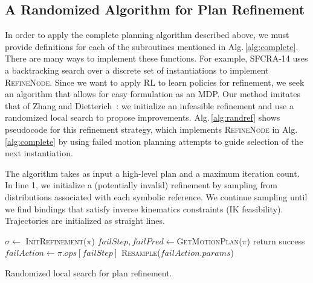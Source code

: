 \subsection{A Randomized Algorithm for Plan Refinement}
In order to apply the complete planning algorithm described above, we must provide definitions for each of the subroutines mentioned in Alg.\,\ref{alg:complete}. There are many ways to implement these functions. For example, SFCRA-14 uses a backtracking search over a discrete set of instantiations to implement \textsc{RefineNode}. Since we want to apply RL to learn policies for refinement,
we seek an algorithm that allows for easy formulation as an MDP. Our method
imitates that of Zhang and Dietterich~\cite{JobShopSched}:
we initialize an infeasible refinement and use a randomized local search to propose
improvements. Alg.\,\ref{alg:randref} shows pseudocode for this refinement strategy,
which implements \textsc{RefineNode} in Alg.\,\ref{alg:complete} by using failed motion planning
attempts to guide selection of the next instantiation.

The algorithm takes as input a high-level plan and a maximum iteration count.
In line 1, we initialize a (potentially invalid) refinement by sampling from distributions associated
with each symbolic reference. We continue sampling
until we find bindings that satisfy inverse kinematics constraints (IK feasibility). Trajectories are
initialized as straight lines.

\begin{algorithm}[t]
\begin{small}
  \SetAlgoLined
  \DontPrintSemicolon
   {
  \nl $\sigma \leftarrow$ \textsc{InitRefinement}($\pi$)\;
  \nl {} {
  \nl $failStep, failPred \leftarrow $\textsc{GetMotionPlan}($\pi$)\;
  \nl {} {
  \nl return success }
  \nl {} {
  \nl $failAction \leftarrow \pi.ops[failStep]$\;
  \nl \textsc{Resample}($failAction.params$) }
  \nl {} }}

\end{small}
\caption{Randomized local search for plan refinement.}
\label{alg:randref}
\end{algorithm}


